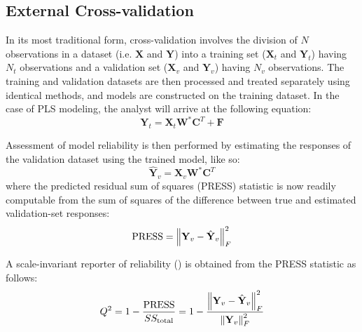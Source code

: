 \subsection{External Cross-validation}

\begin{doublespace}
In its most traditional form, cross-validation involves the division of $N$
observations in a dataset (i.e. $\mathbf{X}$ and $\mathbf{Y}$) into a training
set ($\mathbf{X}_t$ and $\mathbf{Y}_t$) having $N_t$ observations and a
validation set ($\mathbf{X}_v$ and $\mathbf{Y}_v$) having $N_v$ observations.
The training and validation datasets are then processed and treated separately
using identical methods, and models are constructed on the training dataset.
In the case of PLS modeling, the analyst will arrive at the following equation:
\begin{equation}
\mathbf{Y}_t = \mathbf{X}_t \mathbf{W}^\ast \mathbf{C}^T + \mathbf{F}
\end{equation}

Assessment of model reliability is then performed by estimating the responses
of the validation dataset using the trained model, like so:
\begin{equation}
\hat{\mathbf{Y}}_v = \mathbf{X}_v \mathbf{W}^\ast \mathbf{C}^T
\end{equation}
where the predicted residual sum of squares (PRESS) statistic is now readily
computable from the sum of squares of the difference between true and estimated
validation-set responses:
\begin{equation}
\mathrm{PRESS} = \left\| \mathbf{Y}_v - \hat{\mathbf{Y}}_v \right\|_F^2
\end{equation}

A scale-invariant reporter of reliability (\qsq{}) is obtained from the PRESS
statistic as follows:
\begin{equation}
Q^2
 = 1 - \frac{\mathrm{PRESS}}{SS_{\mathrm{total}}{}}
 = 1 - \frac{\left\| \mathbf{Y}_v - \hat{\mathbf{Y}}_v \right\|_F^2}{\left\| \mathbf{Y}_v \right\|_F^2}
\end{equation}


\end{doublespace}
